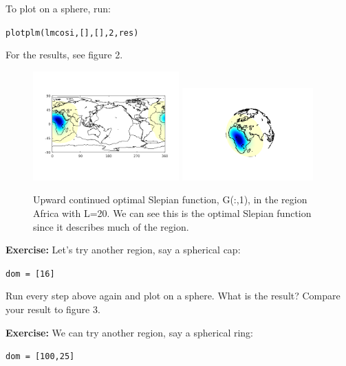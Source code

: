 \documentclass[11pt]{article}
\begin{document}
To plot on a sphere, run:

\verb+plotplm(lmcosi,[],[],2,res)+

For the results, see figure 2.
\begin{figure}[H]
  \includegraphics[width=0.5\textwidth]{figures/potupflatml.png}
  \includegraphics[width=0.45\textwidth]{figures/potupml.png}
  \caption{Upward continued optimal Slepian function, G(:,1), in the region Africa with L=20.  We can see this is the optimal Slepian function since it describes much of the region.}
\label{G(:,1)potup}
\end{figure}

\textbf{Exercise:} Let's try another region, say a spherical cap:

\verb+dom = [16]+

Run every step above again and plot on a sphere.  What is the result?  Compare your result to figure 3.

\textbf{Exercise:} We can try another region, say a spherical ring:

\verb+dom = [100,25]+
\end{document}
